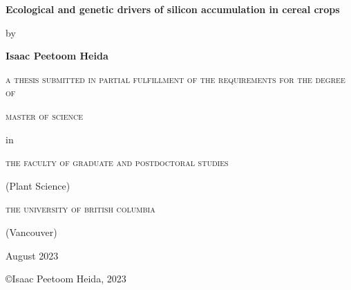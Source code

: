 \begin{titlepage}
    \begin{center}
        \vspace*{1cm}

        \textbf{Ecological and genetic drivers of silicon accumulation in cereal crops}

        \vspace{1cm}

        by 

        \vspace{1cm}

        \textbf{Isaac Peetoom Heida}
        
        \vfill

        \textsc{a thesis submitted in partial fulfillment of the requirements for the degree of}

        \vspace{1cm}

        \textsc{master of science}

        in

        \textsc{the faculty of graduate and postdoctoral studies}

        (Plant Science)

        \textsc{the university of british columbia}

        (Vancouver)

        August 2023

        \copyright Isaac Peetoom Heida, 2023
    \end{center}
\newpage

\end{titlepage}